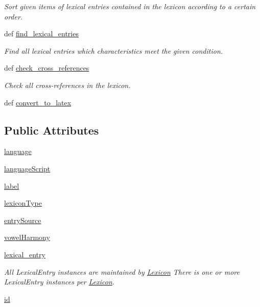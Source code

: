 \begin{DoxyCompactItemize}
\begin{DoxyCompactList}\small\item\em Sort given items of lexical entries contained in the lexicon according to a certain order. \end{DoxyCompactList}\item 
def \hyperlink{classlmf_1_1src_1_1core_1_1lexicon_1_1_lexicon_a8bb0aef3699fd6cbe10a06e7f2e07975}{find\+\_\+lexical\+\_\+entries}
\begin{DoxyCompactList}\small\item\em Find all lexical entries which characteristics meet the given condition. \end{DoxyCompactList}\item 
def \hyperlink{classlmf_1_1src_1_1core_1_1lexicon_1_1_lexicon_a6dd757b26a4579e8ca167ba2fbd55150}{check\+\_\+cross\+\_\+references}
\begin{DoxyCompactList}\small\item\em Check all cross-\/references in the lexicon. \end{DoxyCompactList}\item 
def \hyperlink{classlmf_1_1src_1_1core_1_1lexicon_1_1_lexicon_ad47f7c9a54bea805ede556c488ab2a1d}{convert\+\_\+to\+\_\+latex}
\end{DoxyCompactItemize}
\subsection*{Public Attributes}
\begin{DoxyCompactItemize}
\item 
\hyperlink{classlmf_1_1src_1_1core_1_1lexicon_1_1_lexicon_a17a5f90d6242843af84f145aea4dfe76}{language}
\item 
\hyperlink{classlmf_1_1src_1_1core_1_1lexicon_1_1_lexicon_a33c93912a6bedb0eb095cf85245d6051}{language\+Script}
\item 
\hyperlink{classlmf_1_1src_1_1core_1_1lexicon_1_1_lexicon_a728727809066956b10125e62a954c9c5}{label}
\item 
\hyperlink{classlmf_1_1src_1_1core_1_1lexicon_1_1_lexicon_af434e15172d6aa59954db2a72c9f15f0}{lexicon\+Type}
\item 
\hyperlink{classlmf_1_1src_1_1core_1_1lexicon_1_1_lexicon_a2c62e9663fe3771e684fb4ef94fe1d52}{entry\+Source}
\item 
\hyperlink{classlmf_1_1src_1_1core_1_1lexicon_1_1_lexicon_a0c55ecd82285a7d3dc5d5ebcb1445c25}{vowel\+Harmony}
\item 
\hyperlink{classlmf_1_1src_1_1core_1_1lexicon_1_1_lexicon_a548b2adbf028d9058dd4676cc00d2ee1}{lexical\+\_\+entry}
\begin{DoxyCompactList}\small\item\em All Lexical\+Entry instances are maintained by \hyperlink{classlmf_1_1src_1_1core_1_1lexicon_1_1_lexicon}{Lexicon} There is one or more Lexical\+Entry instances per \hyperlink{classlmf_1_1src_1_1core_1_1lexicon_1_1_lexicon}{Lexicon}. \end{DoxyCompactList}\item 
\hyperlink{classlmf_1_1src_1_1core_1_1lexicon_1_1_lexicon_a8d47ac22571af27a1e989c2c7b14e80b}{id}
\end{DoxyCompactItemize}


